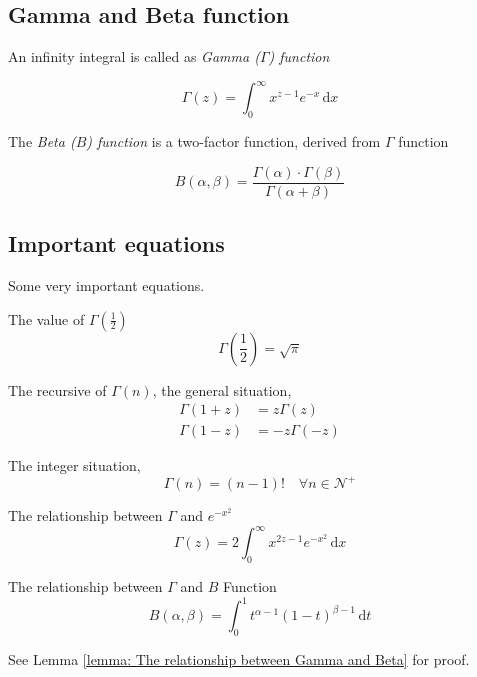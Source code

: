 \documentclass[../main.tex]{subfiles}
\begin{document}
\subsection{Gamma and Beta function}

An infinity integral is called as \emph{Gamma ($\Gamma$) function}

\begin{equation}
    \Gamma(z) = \int_{0}^{\infty} x^{z-1} e^{-x} \,\mathrm{d}x
\end{equation}

The \emph{Beta ($B$) function} is a two-factor function, derived from $\Gamma$ function

\begin{equation}
    B(\alpha, \beta) = \frac{\Gamma(\alpha) \cdot \Gamma(\beta)}{\Gamma(\alpha + \beta)}
\end{equation}

\subsection{Important equations}

\begin{proposition} \label{proposition: Gamma function propositions}
    Some very important equations.

    The value of $\Gamma(\frac{1}{2})$
    \begin{equation}
        \Gamma(\frac{1}{2}) = \sqrt {\pi}
    \end{equation}

    The recursive of $\Gamma(n)$, the general situation,
    \begin{align}
        \Gamma(1+z) & = z \Gamma(z)   \\
        \Gamma(1-z) & = -z \Gamma(-z)
    \end{align}

    The integer situation,
    \begin{equation}
        \Gamma(n) = (n-1)! \quad \forall n \in \mathcal{N}^+
    \end{equation}

    The relationship between $\Gamma$ and $e^{-x^{2}}$
    \begin{equation}
        \Gamma(z) = 2 \int_{0}^{\infty} x^{2z-1} e^{-x^{2}} \,\mathrm{d}x
    \end{equation}

    The relationship between $\Gamma$ and $B$ Function
    \begin{equation}
        B(\alpha, \beta) = \int_{0}^{1} t^{\alpha-1} (1-t)^{\beta-1} \,\mathrm{d}t
    \end{equation}

    See Lemma \ref{lemma: The relationship between Gamma and Beta} for proof.

\end{proposition}
\end{document}
